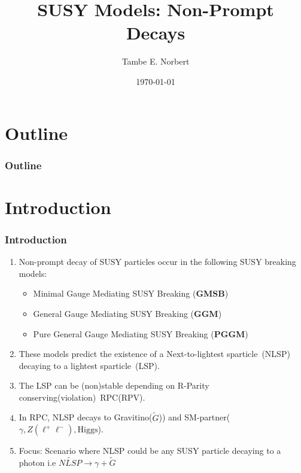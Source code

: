 \documentclass[12pt]{beamer}
\title{\LARGE SUSY Models: Non-Prompt Decays}
\author{Tambe E. Norbert}
\date{\today}
\institute{ University of Minnesota, \\ Email: \url{norbert@physics.umn.edu}}
\begin{document}
\begin{frame}[c]
\titlepage
\end{frame}
\section{Outline}
\begin{frame}
\frametitle{Outline}
\tableofcontents
\end{frame}

\section{Introduction}
\begin{frame}
\frametitle{Introduction}
\begin{enumerate}


\item Non-prompt decay of SUSY particles  occur in the following SUSY breaking models:
	\begin{itemize}
	\item  Minimal Gauge Mediating SUSY Breaking (\textbf{GMSB})
	\item General Gauge Mediating SUSY Breaking (\textbf{GGM})
	\item Pure General Gauge Mediating SUSY Breaking (\textbf{PGGM})
	\end{itemize}
\item  These models predict the existence of a Next-to-lightest sparticle~(NLSP) decaying to a lightest sparticle~(LSP).
\item The LSP can be (non)stable depending on  R-Parity conserving(violation)~RPC(RPV). 
\item In RPC, NLSP decays to Gravitino($\tilde{G}$)) and SM-partner($\gamma,Z(\ell^{+}\ell^{-}),\mbox{Higgs}$).
\item Focus: Scenario where NLSP could be any SUSY particle decaying to a \alert{photon} i.e $\tilde{NLSP}\rightarrow \gamma + \tilde{G}$
\end{enumerate}
\end{frame}
\end{document}
